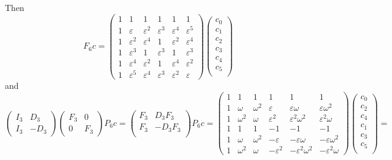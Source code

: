 Then
$$
F_6 c = \begin{pmatrix}
    1 & 1 & 1 & 1 & 1 & 1\\
    1 & \varepsilon & \varepsilon^2 & \varepsilon^3 & \varepsilon^4 & \varepsilon^5\\
    1 & \varepsilon^2 & \varepsilon^4 & 1 & \varepsilon^2 & \varepsilon^4\\
    1 & \varepsilon^3 & 1 & \varepsilon^3 & 1 & \varepsilon^3\\
    1 & \varepsilon^4 & \varepsilon^2 & 1 & \varepsilon^4 & \varepsilon^2\\
    1 & \varepsilon^5 & \varepsilon^4 & \varepsilon^3 & \varepsilon^2 & \varepsilon
    \end{pmatrix}
    \begin{pmatrix}
    c_0 \\
    c_1 \\
    c_2 \\
    c_3 \\
    c_4 \\
    c_5 \\
    \end{pmatrix}
$$
and
$$
\begin{pmatrix}
    I_3 & D_3\\[2pt]
    I_3 & -D_3
    \end{pmatrix}
    \begin{pmatrix}
    F_3 & 0\\
    0 & F_3
    \end{pmatrix}
    P_6 c =
    \begin{pmatrix}
    F_3 & D_3 F_3 \\
    F_3 & -D_3 F_3 \\
    \end{pmatrix} P_6 c =
    \begin{pmatrix}
        1 & 1 & 1 & 1 & 1 & 1\\
        1 & \omega & \omega^2 & \varepsilon & \varepsilon\omega & \varepsilon\omega^2\\
        1 & \omega^2 & \omega & \varepsilon^2 & \varepsilon^2\omega^2 & \varepsilon^2\omega\\
        1 & 1 & 1 & -1 & -1 & -1\\
        1 & \omega & \omega^2 & -\varepsilon & -\varepsilon\omega & -\varepsilon\omega^2\\
        1 & \omega^2 & \omega & -\varepsilon^2 & -\varepsilon^2\omega^2 & -\varepsilon^2\omega
    \end{pmatrix}
    \begin{pmatrix}
    c_0 \\
    c_2 \\
    c_4 \\
    c_1 \\
    c_3 \\
    c_5 \\
    \end{pmatrix} =
$$
